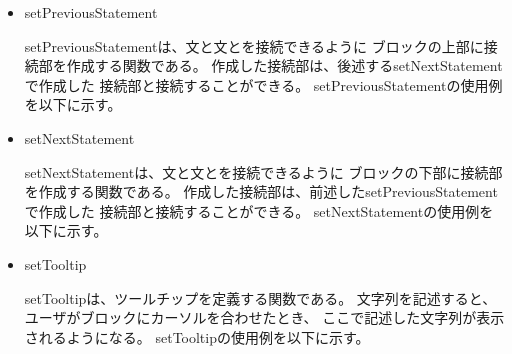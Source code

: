 \documentclass{risepaper}
\begin{document}
\begin{itemize}
\item setPreviousStatement

setPreviousStatementは、文と文とを接続できるように
ブロックの上部に接続部を作成する関数である。
作成した接続部は、後述するsetNextStatementで作成した
接続部と接続することができる。
setPreviousStatementの使用例を以下に示す。


\end{itemize}

\begin{itemize}
\item setNextStatement

setNextStatementは、文と文とを接続できるように
ブロックの下部に接続部を作成する関数である。
作成した接続部は、前述したsetPreviousStatementで作成した
接続部と接続することができる。
setNextStatementの使用例を以下に示す。


\end{itemize}

\begin{itemize}
\item setTooltip

setTooltipは、ツールチップを定義する関数である。
文字列を記述すると、ユーザがブロックにカーソルを合わせたとき、
ここで記述した文字列が表示されるようになる。
setTooltipの使用例を以下に示す。


\end{itemize}
\end{document}

